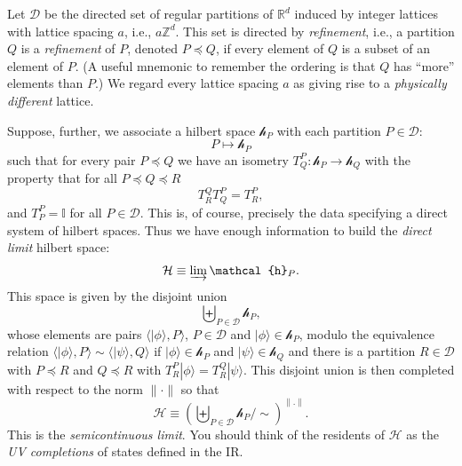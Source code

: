 \documentclass[twocolumn,lengthcheck,superscriptaddress]{revtex4-1}
\theoremstyle{definition}
\theoremstyle{remark}
\begin{document}
Let $\mathcal{D}$ be the directed set of regular partitions of $\mathbb{R}^d$ induced by integer lattices with lattice spacing $a$, i.e., $a\mathbb{Z}^d$. This set is directed by \emph{refinement}, i.e., a partition $Q$ is a \emph{refinement} of $P$, denoted $P \preceq Q$, if every element of $Q$ is a subset of an element of $P$. (A useful mnemonic to remember the ordering is that $Q$ has ``more'' elements than $P$.) We regard every lattice spacing $a$ as giving rise to a \emph{physically different} lattice.
 
Suppose, further, we associate a hilbert space $\mathcal{h}_P$ with each partition $P\in\mathcal{D}$:
\begin{equation}
	P \mapsto \mathcal{h}_P
\end{equation}
such that for every pair $P\preceq Q$ we have an isometry $T_{Q}^P:\mathcal{h}_P\rightarrow \mathcal{h}_Q$ with the property that for all $P\preceq Q\preceq R$
\begin{equation}
	T_{R}^QT_{Q}^P=T_{R}^P,
\end{equation}
and $T^{P}_P = \mathbb{I}$ for all $P\in\mathcal{D}$. This is, of course, precisely the data specifying a direct system of hilbert spaces. Thus we have enough information to build the \emph{direct limit} hilbert space:
\begin{equation}
	\mathcal{H} \equiv \varinjlim \mathcal{h}_P.
\end{equation}
This space is given by the disjoint union 
\begin{equation}
	\biguplus_{P\in\mathcal{D}}\mathcal{h}_P,
\end{equation}
whose elements are pairs $\langle |\phi\rangle, P\rangle$, $P\in\mathcal{D}$ and $|\phi\rangle\in \mathcal{h}_P$, 
modulo the equivalence relation $\langle |\phi\rangle, P\rangle \sim \langle |\psi\rangle, Q\rangle$ if $|\phi\rangle \in \mathcal{h}_P$ and $|\psi\rangle \in \mathcal{h}_Q$ and there is a partition $R\in\mathcal{D}$ with $P\preceq R$ and $Q\preceq R$ with $T_{R}^P|\phi\rangle = T_{R}^Q|\psi\rangle$. This disjoint union is then completed with respect to the norm $\|\cdot\|$ so that
\begin{equation}
	 \mathcal{H} \equiv \left(\biguplus_{P\in\mathcal{D}}\mathcal{h}_P\bigg/\sim\right)^{\|.\|}.
\end{equation} 
This is the \emph{semicontinuous limit}. You should think of the residents of $\mathcal{H}$ as the \emph{UV completions} of states defined in the IR.  
\end{document}
